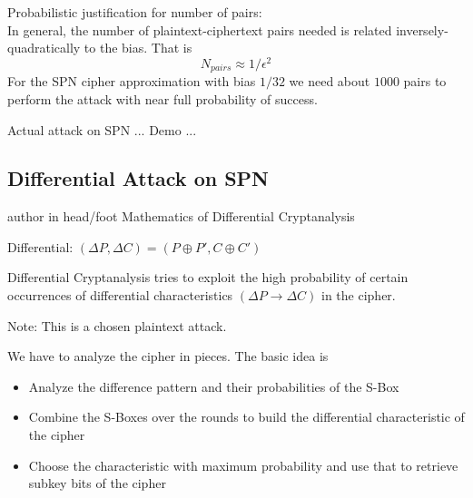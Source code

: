 \documentclass[9pt]{beamer}
\begin{document}
\begin{frame}
Probabilistic justification for number of pairs:\\
\vspace{5mm}
\pause In general, the number of plaintext-ciphertext pairs needed is related inversely-quadratically to the bias. That is
\[ N_{pairs} \approx 1 / \epsilon^2 \]
\pause For the SPN cipher approximation with bias $1/32$ we need about $1000$ pairs to perform the attack with near full probability of success.
\end{frame}

\begin{frame}
Actual attack on SPN ... Demo ...
\end{frame}

\subsection{Differential Attack on SPN}
\begin{frame}
\begin{beamercolorbox}[ht=2.5ex,dp=1.125ex,center,rounded=true,shadow=true]{author in head/foot}
Mathematics of Differential Cryptanalysis
\end{beamercolorbox}
\end{frame}

\begin{frame}
Differential: $(\Delta P, \Delta C) = (P \oplus P', C \oplus C')$

\vspace{5mm}
\pause Differential Cryptanalysis tries to exploit the high probability of certain occurrences of differential characteristics $(\Delta P \rightarrow \Delta C)$ in the cipher. 

\vspace{2mm}
\pause Note: This is a chosen plaintext attack.

\vspace{5mm}
\pause We have to analyze the cipher in pieces. \pause The basic idea is
\begin{itemize}[<+->]
\item{Analyze the difference pattern and their probabilities of the S-Box}
\item{Combine the S-Boxes over the rounds to build the differential characteristic of the cipher}
\item{Choose the characteristic with maximum probability and use that to retrieve subkey bits of the cipher}
\end{itemize}
\end{frame}
\end{document}
